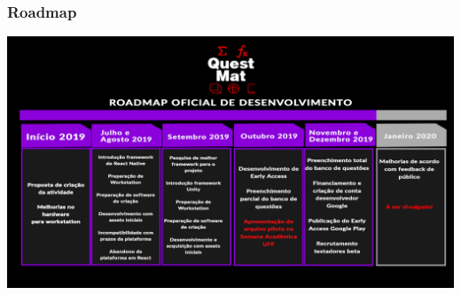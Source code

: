 \documentclass[10pt]{beamer}
\begin{document}

\begin{frame}
	\frametitle{Roadmap}
	
  \includegraphics[width=\linewidth]{ROADMAP_QUESTMAT.jpg}
	
%	
	

	
	
\end{frame}
\end{document}
